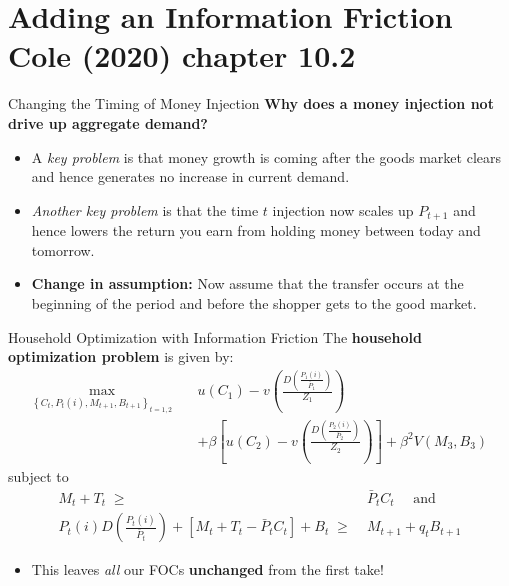 \documentclass[10pt,c,aspectratio=1610,handout]{beamer}
\begin{document}
\section{Adding an Information Friction\\{\small Cole (2020) chapter 10.2}}%
\begin{frame}{Changing the Timing of Money Injection}%
  \textbf{Why does a money injection not drive up aggregate demand?}%
  \vspace*{0.15in}%
  \pause%
  \begin{itemize}%
    \item[$\blacktriangleright$] A \emph{key problem} is that money growth is coming after the goods market clears and hence generates no increase in current demand.%
    \vspace*{0.15in}%
    \pause%
    \item[$\blacktriangleright$] \emph{Another key problem} is that the time $t$ injection now scales up $P_{t+1}$ and hence lowers the return you earn from holding money between today and tomorrow.%
    \vspace*{0.15in}%
    \pause%
    \item[$\blacktriangleright$] \textbf{Change in assumption:} Now assume that the transfer occurs at the beginning of the period and before the shopper gets to the good market.%
  \end{itemize}%
\end{frame}%
\begin{frame}{Household Optimization with Information Friction}%
  The \textbf{household optimization problem} is given by:%
  \begin{align*}%
    \max_{\left\{ C_{t},P_{t}(i),M_{t+1},B_{t+1}\right\}_{t=1,2}} \quad & u(C_{1})-v\left( \frac{D \left( \frac{P_{1}(i)}{\bar{P}_{1}}\right)}{Z_1} \right)\\%
    & +\beta \left[ u(C_{2})-v\left( \frac{D\left( \frac{P_{2}(i)}{\bar{P}_{2}}\right)}{Z_2} \right) \right] +\beta^{2}V(M_{3},B_{3})%
  \end{align*}%
  subject to%
  \begin{align*}%
    M_{t}+T_{t} \; \geq & \;\bar{P}_{t}C_{t} \quad \text{ and } \\%
    P_{t}(i) D\left( \frac{P_{t}(i)}{\bar{P}_{t}} \right) + \left[ M_{t}+T_{t}-\bar{P}_{t}C_{t}\right] + B_{t} \; \geq & \; M_{t+1} + q_{t}B_{t+1}%
  \end{align*}%
  \pause%
  \begin{itemize}%
    \item[$\Rightarrow$] This leaves \textit{all} our FOCs \textbf{unchanged} from the first take!%
  \end{itemize}%
\end{frame}%
\end{document}
